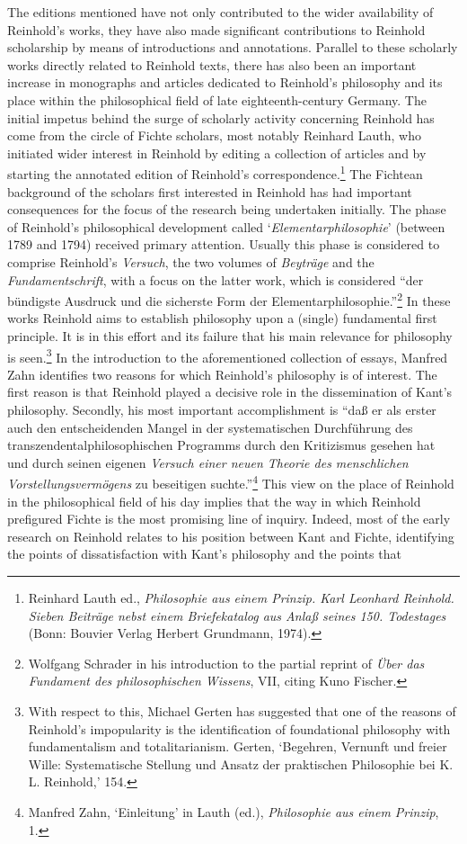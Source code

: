  The editions mentioned have not only contributed to the wider availability of Reinhold's works, they have also made significant contributions to Reinhold scholarship by means of introductions and annotations. Parallel to these scholarly works directly related to Reinhold texts, there has also been an important increase in monographs and articles dedicated to Reinhold's philosophy and its place within the philosophical field of late eighteenth{-}century Germany. The initial impetus behind the surge of scholarly activity concerning Reinhold has come from the circle of Fichte scholars, most notably Reinhard Lauth, who initiated wider interest in Reinhold by editing a collection of articles and by starting the annotated edition of Reinhold's correspondence.\footnote{\label{footnote:_Ref233188211} Reinhard Lauth ed., \textit{Philosophie aus einem Prinzip. Karl Leonhard Reinhold. Sieben Beitr\"{a}ge nebst einem Briefekatalog aus Anla\ss{} seines 150. Todestages} (Bonn: Bouvier Verlag Herbert Grundmann, 1974).} The Fichtean background of the scholars first interested in Reinhold has had important consequences for the focus of the research being undertaken initially. The phase of Reinhold's philosophical development called `\textit{Elementarphilosophie}' (between 1789 and 1794) received primary attention. Usually this phase is considered to comprise Reinhold's \textit{Versuch}, the two volumes of \textit{Beytr\"{a}ge} and the \textit{Fundamentschrift}, with a focus on the latter work, which is considered ``der b\"{u}ndigste Ausdruck und die sicherste Form der Elementarphilosophie.''\footnote{ Wolfgang Schrader in his introduction to the partial reprint of \textit{\"{U}ber das Fundament des philosophischen Wissens}, VII, citing Kuno Fischer. } In these works Reinhold aims to establish philosophy upon a (single) fundamental first principle. It is in this effort and its failure that his main relevance for philosophy is seen.\footnote{ With respect to this, Michael Gerten has suggested that one of the reasons of Reinhold's impopularity is the identification of foundational philosophy with fundamentalism and totalitarianism. Gerten, `Begehren, Vernunft und freier Wille: Systematische Stellung und Ansatz der praktischen Philosophie bei K. L. Reinhold,' 154. } In the introduction to the aforementioned collection of essays, Manfred Zahn identifies two reasons for which Reinhold's philosophy is of interest. The first reason is that Reinhold played a decisive role in the dissemination of Kant's philosophy. Secondly, his most important accomplishment is ``da\ss{} er als erster auch den entscheidenden Mangel in der systematischen Durchf\"{u}hrung des transzendentalphilosophischen Programms durch den Kritizismus gesehen hat und durch seinen eigenen \textit{Versuch einer neuen Theorie des menschlichen Vorstellungsverm\"{o}gens }zu beseitigen suchte.''\footnote{ Manfred Zahn, `Einleitung' in Lauth (ed.), \textit{Philosophie aus einem Prinzip}, 1.} This view on the place of Reinhold in the philosophical field of his day implies that the way in which Reinhold prefigured Fichte is the most promising line of inquiry. Indeed, most of the early research on Reinhold relates to his position between Kant and Fichte, identifying the points of dissatisfaction with Kant's philosophy and the points that 